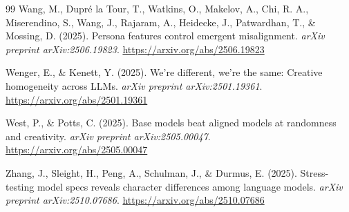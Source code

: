 \documentclass[11pt,a4paper]{article}
\begin{document}
\begin{thebibliography}{99}
Wang, M., Dupr\'e la Tour, T., Watkins, O., Makelov, A., Chi, R. A., Miserendino, S., Wang, J., Rajaram, A., Heidecke, J., Patwardhan, T., \& Mossing, D. (2025).
\newblock Persona features control emergent misalignment.
\newblock \emph{arXiv preprint arXiv:2506.19823}.
\newblock \url{https://arxiv.org/abs/2506.19823}

Wenger, E., \& Kenett, Y. (2025).
\newblock We're different, we're the same: Creative homogeneity across LLMs.
\newblock \emph{arXiv preprint arXiv:2501.19361}.
\newblock \url{https://arxiv.org/abs/2501.19361}

West, P., \& Potts, C. (2025).
\newblock Base models beat aligned models at randomness and creativity.
\newblock \emph{arXiv preprint arXiv:2505.00047}.
\newblock \url{https://arxiv.org/abs/2505.00047}

Zhang, J., Sleight, H., Peng, A., Schulman, J., \& Durmus, E. (2025).
\newblock Stress-testing model specs reveals character differences among language models.
\newblock \emph{arXiv preprint arXiv:2510.07686}.
\newblock \url{https://arxiv.org/abs/2510.07686}

\end{thebibliography}
\end{document}
